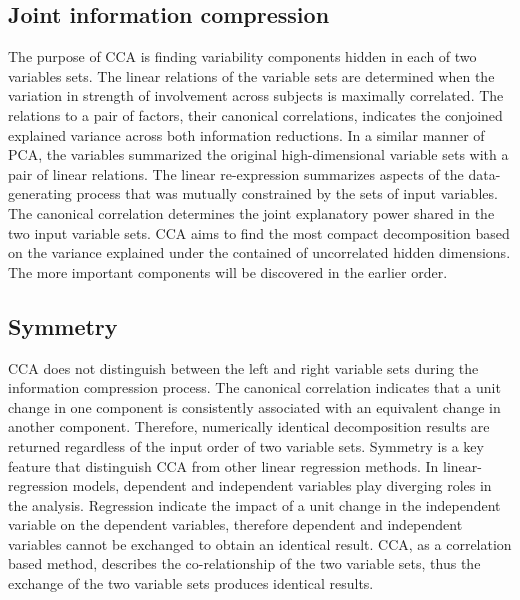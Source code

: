 \subsection{Joint information compression}
The purpose of CCA is finding variability components hidden in each of two variables sets.  The linear relations of the variable sets are determined when the variation in strength of involvement across subjects is maximally correlated. The relations to a pair of factors, their canonical correlations, indicates the conjoined explained variance across both information reductions. In a similar manner of PCA, the variables summarized the original high-dimensional variable sets with a pair of linear relations. The linear re-expression summarizes aspects of the data-generating process that was mutually constrained by the sets of input variables. The canonical correlation determines the joint explanatory power shared in the two input variable sets. CCA aims to find the most compact decomposition based on the variance explained under the contained of uncorrelated hidden dimensions. The more important components will be discovered in the earlier order.

\subsection{Symmetry}
CCA does not distinguish between the left and right variable sets during the information compression process. The canonical correlation indicates that a unit change in one component is consistently associated with an equivalent change in another component. Therefore, numerically identical decomposition results are returned regardless of the input order of two variable sets. Symmetry is a key feature that distinguish CCA from other linear regression methods. In linear-regression models, dependent and independent variables play diverging roles in the analysis. Regression indicate the impact of a unit change in the independent variable on the dependent variables, therefore dependent and independent variables cannot be exchanged to obtain an identical result. CCA, as a correlation based method, describes the co-relationship of the two variable sets, thus the exchange of the two variable sets produces identical results.


